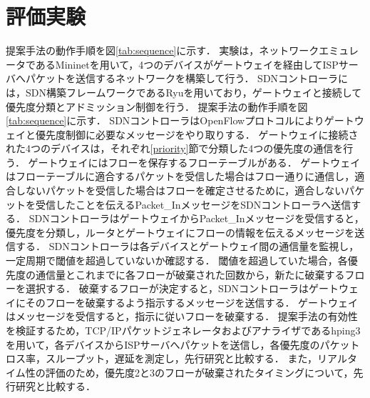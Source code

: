 \documentclass[a4paper,10pt,twocolumn,uplatex]{jsarticle}
\begin{document}
\section{評価実験}
提案手法の動作手順を図\ref{tab:sequence}に示す．
実験は，ネットワークエミュレータであるMininetを用いて，4つのデバイスがゲートウェイを経由してISPサーバへパケットを送信するネットワークを構築して行う．
SDNコントローラには，SDN構築フレームワークであるRyuを用いており，ゲートウェイと接続して優先度分類とアドミッション制御を行う．
提案手法の動作手順を図\ref{tab:sequence}に示す．
SDNコントローラはOpenFlowプロトコルによりゲートウェイと優先度制御に必要なメッセージをやり取りする．
ゲートウェイに接続された4つのデバイスは，それぞれ\ref{priority}節で分類した4つの優先度の通信を行う．
ゲートウェイにはフローを保存するフローテーブルがある．
ゲートウェイはフローテーブルに適合するパケットを受信した場合はフロー通りに通信し，適合しないパケットを受信した場合はフローを確定させるために，適合しないパケットを受信したことを伝えるPacket\_InメッセージをSDNコントローラへ送信する．
SDNコントローラはゲートウェイからPacket\_Inメッセージを受信すると，優先度を分類し，ルータとゲートウェイにフローの情報を伝えるメッセージを送信する．
SDNコントローラは各デバイスとゲートウェイ間の通信量を監視し，一定周期で閾値を超過していないか確認する．
閾値を超過していた場合，各優先度の通信量とこれまでに各フローが破棄された回数から，新たに破棄するフローを選択する．
破棄するフローが決定すると，SDNコントローラはゲートウェイにそのフローを破棄するよう指示するメッセージを送信する．
ゲートウェイはメッセージを受信すると，指示に従いフローを破棄する．
提案手法の有効性を検証するため，TCP/IPパケットジェネレータおよびアナライザであるhping3を用いて，各デバイスからISPサーバへパケットを送信し，各優先度のパケットロス率，スループット，遅延を測定し，先行研究と比較する．
また，リアルタイム性の評価のため，優先度2と3のフローが破棄されたタイミングについて，先行研究と比較する．
\end{document}
